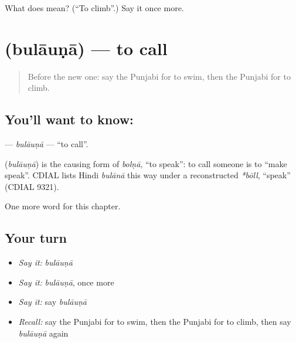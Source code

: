 \begin{tcolorbox}[breakable,colback=teal!4,colframe=teal!35!black,title={Before you move on}]
What does  mean? (\textquotedblleft{}To climb\textquotedblright{}.) Say it once more.
\end{tcolorbox}
\section[\texorpdfstring{\pa{ਬੁਲਾਉਣਾ} (bulāuṇā)}{ਬੁਲਾਉਣਾ (bulāuṇā)}]{ (bulāuṇā) — to call}

\label{lesson:PA-C149-bulauna}



\begin{quote}
Before the new one: say the Punjabi for to swim, then the Punjabi for to climb.
\end{quote}

\subsection*{You'll want to know: }
\textbf{} — \emph{bulāuṇā} — \textquotedblleft{}to call\textquotedblright{}.

\begin{cousinweb}
\textbf{} (\emph{bulāuṇā}) is the causing form of \emph{bolṇā}, \textquotedblleft{}to speak\textquotedblright{}: to call someone is to \textquotedblleft{}make speak\textquotedblright{}. CDIAL lists Hindi \emph{bulānā} this way under a reconstructed \emph{*bōll}, \textquotedblleft{}speak\textquotedblright{} (CDIAL 9321).
\end{cousinweb}

\begin{grammarlens}[title={What you've built}]
One more word for this chapter.
\end{grammarlens}

\subsection*{Your turn}
\begin{itemize}
\raggedright
  \item \emph{Say it:} \emph{bulāuṇā}
  \item \emph{Say it:} \emph{bulāuṇā}, once more
  \item \emph{Say it:} say \emph{bulāuṇā}
  \item \emph{Recall:} say the Punjabi for to swim, then the Punjabi for to climb, then say \emph{bulāuṇā} again
\end{itemize}

